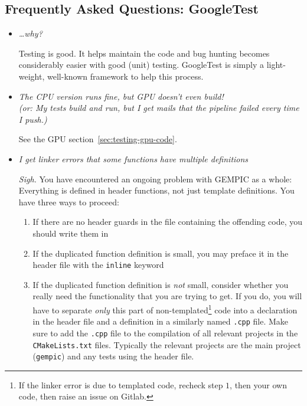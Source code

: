 \documentclass[11pt]{article}
\newcommand{\gt}{GoogleTest}
\begin{document}
\subsection*{Frequently Asked Questions: GoogleTest}
\begin{itemize}
    \item \emph{\ldots why?}

    Testing is good. It helps maintain the code and bug hunting becomes considerably easier with good (unit) testing. \gt{} is simply a light-weight, well-known framework to help this process.

    \item \emph{The CPU version runs fine, but GPU doesn't even build!\\ (or: My tests build and run, but I get mails that the pipeline failed every time I push.)}

    See the GPU section~\ref{sec:testing-gpu-code}.

    \item \emph{I get linker errors that some functions have multiple definitions}
    
    \emph{Sigh.} You have encountered an ongoing problem with GEMPIC as a whole: Everything is defined in header functions, not just template definitions. You have three ways to proceed:
    \begin{enumerate}
        \item If there are no header guards in the file containing the offending code, you should write them in
        \item If the duplicated function definition is small, you may preface it in the header file with the \lstinline{inline} keyword 
        \item If the duplicated function definition is \emph{not} small, consider whether you really need the functionality that you are trying to get. If you do, you will have to separate \emph{only} this part of non-templated\footnote{If the linker error is due to templated code, recheck step $1$, then your own code, then raise an issue on Gitlab.} code into a declaration in the header file and a definition in a similarly named \verb|.cpp| file. Make sure to add the \verb|.cpp| file to the compilation of all relevant projects in the \verb|CMakeLists.txt| files. Typically the relevant projects are the main project (\verb|gempic|) and any tests using the header file.
    \end{enumerate}
\end{itemize}
\end{document}
